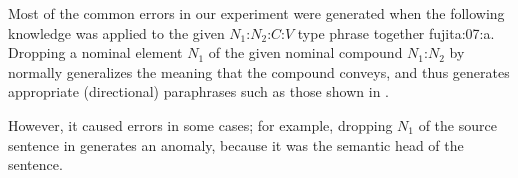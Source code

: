 \documentclass[english]{jnlp_1.4}
\renewcommand{\cite}{}
\begin{document}
Most of the common errors in our experiment were generated when the
following knowledge was applied to the given $N_{1}$:$N_{2}$:$C$:$V$
type phrase together \cite{fujita:07:a}.
Dropping a nominal element $N_{1}$ of the given nominal compound
$N_{1}$:$N_{2}$ by  normally generalizes the
meaning that the compound conveys, and thus generates appropriate
(directional) paraphrases such as those shown in .
\begin{multicols}{2}
\end{multicols}
{\noindent}However, it caused errors in some cases; for example,
dropping $N_{1}$ of the source sentence in  generates an
anomaly, because it was the semantic head of the sentence.
\begin{multicols}{2}
\end{multicols}
\end{document}
